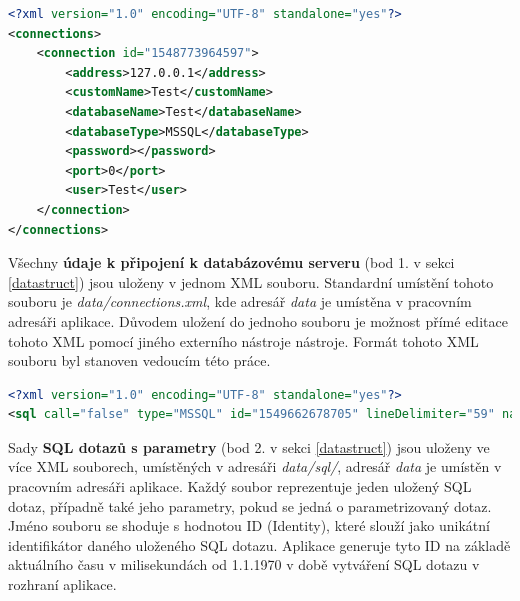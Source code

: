 \documentclass[czech,bachelor,public,dept460,male,cpdeclaration,twoside]{diploma}
\begin{document}
\begin{minipage}{\linewidth}
\begin{lstlisting}[caption=Údaje k připojení k databázovému serveru ve formátu XML\label{lst:con},language=XML] 
<?xml version="1.0" encoding="UTF-8" standalone="yes"?>
<connections>
    <connection id="1548773964597">
        <address>127.0.0.1</address>
        <customName>Test</customName>
        <databaseName>Test</databaseName>
        <databaseType>MSSQL</databaseType>
        <password></password>
        <port>0</port>
        <user>Test</user>
    </connection>
</connections>
\end{lstlisting}
Všechny \textbf{údaje k připojení k databázovému serveru} (bod 1. v sekci \ref{datastruct}) jsou uloženy v jednom XML souboru. Standardní umístění tohoto souboru je \textit{data/connections.xml}, kde adresář \textit{data} je umístěna v pracovním adresáři aplikace. Důvodem uložení do jednoho souboru je možnost přímé editace tohoto XML pomocí jiného externího nástroje nástroje. Formát tohoto XML souboru byl stanoven vedoucím této práce.
\end{minipage}

\lstset{aboveskip=30pt}

\begin{minipage}{\linewidth}
\begin{lstlisting}[caption=SQL dotazy s parametry ve formátu XML\label{lst:set},language=XML] 
<?xml version="1.0" encoding="UTF-8" standalone="yes"?>
<sql call="false" type="MSSQL" id="1549662678705" lineDelimiter="59" name="MujSelect" paramDelimiter="44" parametrized="true" query="true" text="select * from test;" timeout="100" update="false"/>
\end{lstlisting}
Sady \textbf{SQL dotazů s parametry} (bod 2. v sekci \ref{datastruct}) jsou uloženy ve více XML souborech, umístěných v adresáři \textit{data/sql/}, adresář \textit{data} je umístěn v pracovním adresáři aplikace. Každý soubor reprezentuje jeden uložený SQL dotaz, případně také jeho parametry, pokud se jedná o parametrizovaný dotaz. Jméno souboru se shoduje s hodnotou ID (Identity), které slouží jako unikátní identifikátor daného uloženého SQL dotazu. Aplikace generuje tyto ID na základě aktuálního času v milisekundách od 1.1.1970 v době vytváření SQL dotazu v rozhraní aplikace.
\end{minipage}

\lstset{aboveskip=30pt}
\end{document}
